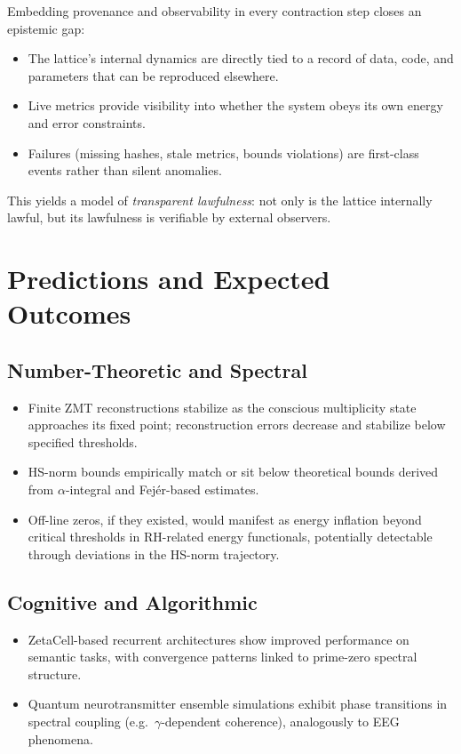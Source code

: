 \documentclass[11pt]{article}
\begin{document}
Embedding provenance and observability in every contraction step closes an epistemic gap:

\begin{itemize}[leftmargin=*]
  \item The lattice's internal dynamics are directly tied to a record of data, code, and parameters that can be reproduced elsewhere.
  \item Live metrics provide visibility into whether the system obeys its own energy and error constraints.
  \item Failures (missing hashes, stale metrics, bounds violations) are first-class events rather than silent anomalies.
\end{itemize}

This yields a model of \emph{transparent lawfulness}: not only is the lattice internally lawful, but its lawfulness is verifiable by external observers.

\section{Predictions and Expected Outcomes}

\subsection{Number-Theoretic and Spectral}

\begin{itemize}[leftmargin=*]
  \item Finite ZMT reconstructions stabilize as the conscious multiplicity state approaches its fixed point; reconstruction errors decrease and stabilize below specified thresholds.
  \item HS-norm bounds empirically match or sit below theoretical bounds derived from $\alpha$-integral and Fejér-based estimates.
  \item Off-line zeros, if they existed, would manifest as energy inflation beyond critical thresholds in RH-related energy functionals, potentially detectable through deviations in the HS-norm trajectory.
\end{itemize}

\subsection{Cognitive and Algorithmic}

\begin{itemize}[leftmargin=*]
  \item ZetaCell-based recurrent architectures show improved performance on semantic tasks, with convergence patterns linked to prime-zero spectral structure.
  \item Quantum neurotransmitter ensemble simulations exhibit phase transitions in spectral coupling (e.g.\ $\gamma$-dependent coherence), analogously to EEG phenomena.
\end{itemize}
\end{document}
